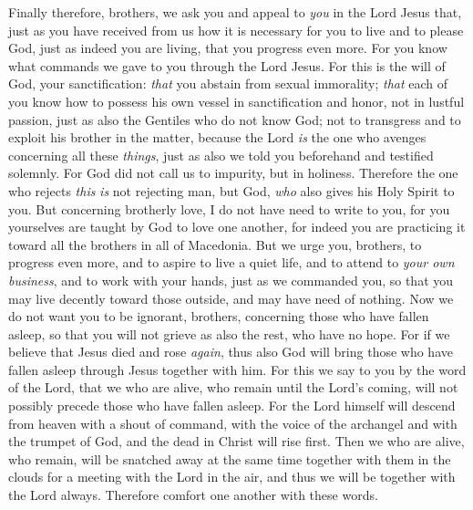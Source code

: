 \begin{biblechapter} %
 Finally therefore, brothers, we ask you and appeal to \textit{you} in the Lord Jesus that, just as you have received from us how it is necessary for you to live and to please God, just as indeed you are living, that you progress even more.
\verse For you know what commands we gave to you through the Lord Jesus.
\verse For this is the will of God, your sanctification: \textit{that} you abstain from sexual immorality;
\verse \textit{that} each of you know how to possess his own vessel in sanctification and honor,
\verse not in lustful passion, just as also the Gentiles who do not know God;
\verse not to transgress and to exploit his brother in the matter, because the Lord \textit{is} the one who avenges concerning all these \textit{things}, just as also we told you beforehand and testified solemnly.
\verse For God did not call us to impurity, but in holiness.
\verse Therefore the one who rejects \textit{this} \textit{is} not rejecting man, but God, \textit{who} also gives his Holy Spirit to you.
 But concerning brotherly love, I do not have need to write to you, for you yourselves are taught by God to love one another,
\verse for indeed you are practicing it toward all the brothers in all of Macedonia. But we urge you, brothers, to progress even more,
\verse and to aspire to live a quiet life, and to attend to \textit{your own business}, and to work with your hands, just as we commanded you,
\verse so that you may live decently toward those outside, and may have need of nothing.
 Now we do not want you to be ignorant, brothers, concerning those who have fallen asleep, so that you will not grieve as also the rest, who have no hope.
\verse For if we believe that Jesus died and rose \textit{again}, thus also God will bring those who have fallen asleep through Jesus together with him.
\verse For this we say to you by the word of the Lord, that we who are alive, who remain until the Lord’s coming, will not possibly precede those who have fallen asleep.
\verse For the Lord himself will descend from heaven with a shout of command, with the voice of the archangel and with the trumpet of God, and the dead in Christ will rise first.
\verse Then we who are alive, who remain, will be snatched away at the same time together with them in the clouds for a meeting with the Lord in the air, and thus we will be together with the Lord always.
\verse Therefore comfort one another with these words.
\end{biblechapter}

